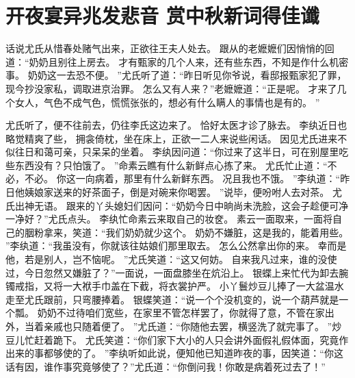 \chapter{开夜宴异兆发悲音 \quad 赏中秋新词得佳谶}
\par
{}\par
话说尤氏从惜春处赌气出来，正欲往王夫人处去。
跟从的老嬷嬷们因悄悄的回道：“奶奶且别往上房去。
才有甄家的几个人来，还有些东西，不知是作什么机密事。
奶奶这一去恐不便。
”尤氏听了道：“昨日听见你爷说，看邸报甄家犯了罪，现今抄没家私，调取进京治罪。
怎么又有人来？”老嬷嬷道：“正是呢。
才来了几个女人，气色不成气色，慌慌张张的，想必有什么瞒人的事情也是有的。
”\par
尤氏听了，便不往前去，仍往李氏这边来了。
恰好太医才诊了脉去。
李纨近日也略觉精爽了些，
拥衾倚枕，坐在床上，正欲一二人来说些闲话。
因见尤氏进来不似往日和蔼可亲，只呆呆的坐着。
李纨因问道：“你过来了这半日，可在别屋里吃些东西没有？只怕饿了。
”命素云瞧有什么新鲜点心拣了来。
尤氏忙止道：“不必，不必。
你这一向病着，那里有什么新鲜东西。
况且我也不饿。
”李纨道：“昨日他姨娘家送来的好茶面子，倒是对碗来你喝罢。
”说毕，便吩咐人去对茶。
尤氏出神无语。
跟来的丫头媳妇们因问：“奶奶今日中晌尚未洗脸，这会子趁便可净一净好？”尤氏点头。
李纨忙命素云来取自己的妆奁。
素云一面取来，一面将自己的胭粉拿来，笑道：“我们奶奶就少这个。
奶奶不嫌脏，这是我的，能着用些。
”李纨道：“我虽没有，你就该往姑娘们那里取去。
怎么公然拿出你的来。
幸而是他，若是别人，岂不恼呢。
”尤氏笑道：“这又何妨。
自来我凡过来，谁的没使过，今日忽然又嫌脏了？”一面说，一面盘膝坐在炕沿上。
银蝶上来忙代为卸去腕镯戒指，又将一大袱手巾盖在下截，将衣裳护严。
小丫鬟炒豆儿捧了一大盆温水走至尤氏跟前，只弯腰捧着。
银蝶笑道：“说一个个没机变的，说一个葫芦就是一个瓢。
奶奶不过待咱们宽些，在家里不管怎样罢了，你就得了意，不管在家出外，当着亲戚也只随着便了。
”尤氏道：“你随他去罢，横竖洗了就完事了。
”炒豆儿忙赶着跪下。
尤氏笑道：“你们家下大小的人只会讲外面假礼假体面，究竟作出来的事都够使的了。
”李纨听如此说，便知他已知道昨夜的事，因笑道：“你这话有因，谁作事究竟够使了？”尤氏道：“你倒问我！你敢是病着死过去了！”\par
